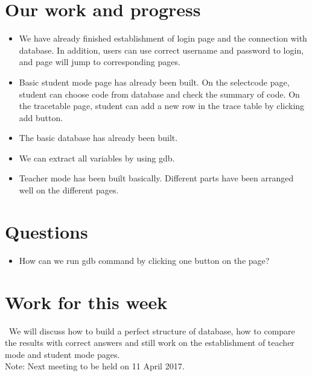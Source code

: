 \documentclass[11pt, a4paper]{article}
\begin{document}
\section{Our work and progress}
\begin {itemize} 
\item We have already finished establishment of login page and the connection with database. In addition, users can use correct username and password to login, and page will jump to corresponding pages.  
\item Basic student mode page has already been built. On the selectcode page, student can choose code from database and check the summary of code. On the tracetable page, student can add a new row in the trace table by clicking add button. 
\item The basic database has already been built.
\item We can extract all variables by using gdb.
\item Teacher mode has been built basically. Different parts have been arranged well on the different pages.

\end {itemize}


\section{Questions}
\begin {itemize} 
\item How can we run gdb command by clicking one button on the page?
\end {itemize}

\section{Work for this week}
\ We will discuss how to build a perfect structure of database, how to compare the results with correct answers and still work on the establishment of teacher mode and student mode pages. \\


\vspace*{10pt}
\noindent Note: Next meeting to be held on 11 April 2017.
\end{document}
